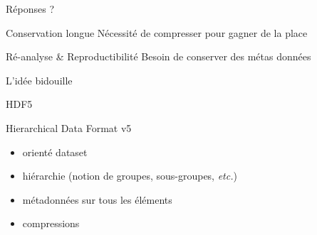\documentclass[10pt]{beamer}
\newcommand\etc{\textit{etc.}}
\newcommand\fileimage[1]{%
	\draw[fill=black!2] (#1) -- ++(2,0) -- ++(0,2.5) -- ++(-1.5,0) -- ++(-.5,-.5) -- cycle;
}
\begin{document}
\begin{frame}{Réponses ?}
	\begin{block}{Conservation longue}
		Nécessité de compresser pour gagner de la place
	\end{block}

	\begin{block}{Ré-analyse \& Reproductibilité}
		Besoin de conserver des métas données
	\end{block}
\end{frame}

\begin{frame}{L'idée bidouille}
	\centering
\end{frame}

\begin{frame}{HDF5}
	\begin{center}
		Hierarchical Data Format v5
	\end{center}

	\begin{itemize}
		\item orienté dataset
		\item hiérarchie (notion de groupes, sous-groupes, \etc)
		\item métadonnées sur tous les éléments
		\item compressions
	\end{itemize}
\end{frame}
\end{document}
